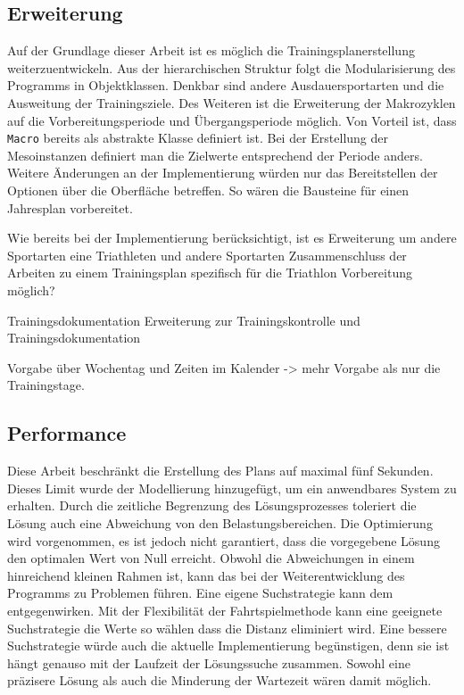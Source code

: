 \subsection{Erweiterung} 
Auf der Grundlage dieser Arbeit ist es möglich die Trainingsplanerstellung weiterzuentwickeln. Aus der hierarchischen Struktur folgt die Modularisierung des Programms in Objektklassen. Denkbar sind andere Ausdauersportarten und die Ausweitung der Trainingsziele. Des Weiteren ist die Erweiterung der Makrozyklen auf die Vorbereitungsperiode und Übergangsperiode möglich. Von Vorteil ist, dass \texttt{Macro} bereits als abstrakte Klasse definiert ist. Bei der Erstellung der Mesoinstanzen definiert man die Zielwerte entsprechend der Periode anders. Weitere Änderungen an der Implementierung würden nur das Bereitstellen der Optionen über die Oberfläche betreffen. So wären die Bausteine für einen Jahresplan vorbereitet.\par

Wie bereits bei der Implementierung berücksichtigt, ist es Erweiterung um andere Sportarten eine Triathleten und andere Sportarten
Zusammenschluss der Arbeiten zu einem Trainingsplan spezifisch für die Triathlon Vorbereitung möglich? \par
Trainingsdokumentation
Erweiterung zur Trainingskontrolle und Trainingsdokumentation \par
Vorgabe über Wochentag und Zeiten im Kalender -> mehr Vorgabe als nur die Trainingstage.
    
\subsection{Performance}
Diese Arbeit beschränkt die Erstellung des Plans auf maximal fünf Sekunden. Dieses Limit wurde der Modellierung hinzugefügt, um ein anwendbares System zu erhalten. Durch die zeitliche Begrenzung des Lösungsprozesses toleriert die Lösung auch eine Abweichung von den Belastungsbereichen. Die Optimierung wird vorgenommen, es ist jedoch nicht garantiert, dass die vorgegebene Lösung den optimalen Wert von Null erreicht. Obwohl die Abweichungen in einem hinreichend kleinen Rahmen ist, kann das bei der Weiterentwicklung des Programms zu Problemen führen. \newline
Eine eigene Suchstrategie kann dem entgegenwirken. Mit der Flexibilität der Fahrtspielmethode kann eine geeignete Suchstrategie die Werte so wählen dass die Distanz eliminiert wird. Eine bessere Suchstrategie würde auch die aktuelle Implementierung begünstigen, denn sie ist hängt genauso mit der Laufzeit der Lösungssuche zusammen. Sowohl eine präzisere Lösung als auch die Minderung der Wartezeit wären damit möglich.

